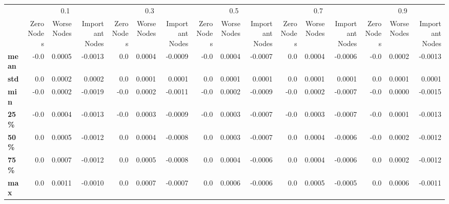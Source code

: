\begin{tabular}{lrrrrrrrrrrrrrrr}
\toprule
{} & \multicolumn{3}{c}{0.1} & \multicolumn{3}{c}{0.3} & \multicolumn{3}{c}{0.5} & \multicolumn{3}{c}{0.7} & \multicolumn{3}{c}{0.9} \\
{} & Zero Nodes & Worse Nodes & Important Nodes & Zero Nodes & Worse Nodes & Important Nodes & Zero Nodes & Worse Nodes & Important Nodes & Zero Nodes & Worse Nodes & Important Nodes & Zero Nodes & Worse Nodes & Important Nodes \\
\midrule
\textbf{mean} &       -0.0 &      0.0005 &         -0.0013 &        0.0 &      0.0004 &         -0.0009 &       -0.0 &      0.0004 &         -0.0007 &        0.0 &      0.0004 &         -0.0006 &       -0.0 &      0.0002 &         -0.0013 \\
\textbf{std } &        0.0 &      0.0002 &          0.0002 &        0.0 &      0.0001 &          0.0001 &        0.0 &      0.0001 &          0.0001 &        0.0 &      0.0001 &          0.0001 &        0.0 &      0.0001 &          0.0001 \\
\textbf{min } &       -0.0 &      0.0002 &         -0.0019 &       -0.0 &      0.0002 &         -0.0011 &       -0.0 &      0.0002 &         -0.0009 &       -0.0 &      0.0002 &         -0.0007 &       -0.0 &      0.0000 &         -0.0015 \\
\textbf{25\% } &       -0.0 &      0.0004 &         -0.0013 &       -0.0 &      0.0003 &         -0.0009 &       -0.0 &      0.0003 &         -0.0007 &       -0.0 &      0.0003 &         -0.0007 &       -0.0 &      0.0001 &         -0.0013 \\
\textbf{50\% } &        0.0 &      0.0005 &         -0.0012 &        0.0 &      0.0004 &         -0.0008 &        0.0 &      0.0003 &         -0.0007 &        0.0 &      0.0004 &         -0.0006 &       -0.0 &      0.0002 &         -0.0012 \\
\textbf{75\% } &        0.0 &      0.0007 &         -0.0012 &        0.0 &      0.0005 &         -0.0008 &        0.0 &      0.0004 &         -0.0006 &        0.0 &      0.0004 &         -0.0006 &        0.0 &      0.0002 &         -0.0012 \\
\textbf{max } &        0.0 &      0.0011 &         -0.0010 &        0.0 &      0.0007 &         -0.0007 &        0.0 &      0.0006 &         -0.0006 &        0.0 &      0.0005 &         -0.0005 &        0.0 &      0.0006 &         -0.0011 \\
\bottomrule
\end{tabular}
